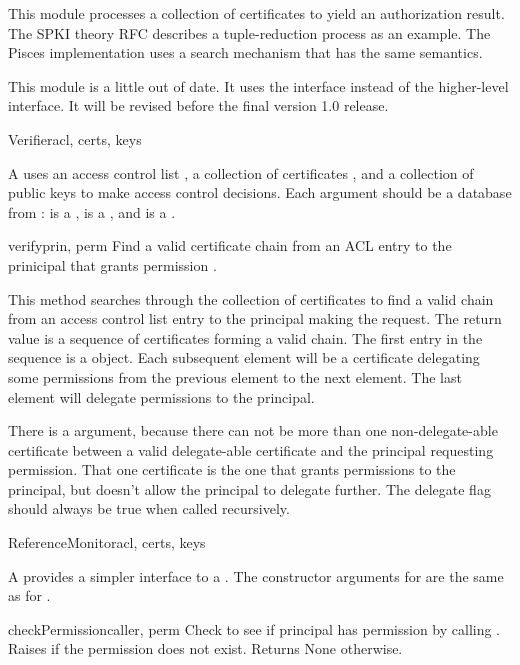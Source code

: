 \documentclass{howto}
\begin{document}
This module processes a collection of certificates to yield an
authorization result.  The SPKI theory RFC \cite{ellison99-theory}
describes a tuple-reduction process as an example.  The Pisces
implementation uses a search mechanism that has the same semantics.

This module is a little out of date.  It uses the
 interface instead of the higher-level
 interface.  It will be revised before
the final version 1.0 release.

\begin{classdesc}{Verifier}{acl, certs, keys}

A  uses an access control list , a collection
of certificates , and a collection of public keys 
to make access control decisions.  Each argument should be a database
from :  is a ,
 is a , and  is a 
.

\begin{methoddesc}{verify}{prin, perm}
Find a valid certificate chain from an ACL entry to the prinicipal
 that grants permission .

This method searches through the collection of certificates to find a
valid chain from an access control list entry to the principal making
the request.  The return value is a sequence of certificates forming a
valid chain.  The first entry in the sequence is a 
 object.  Each subsequent element
will be a certificate delegating some permissions from the previous
element to the next element.  The last element will delegate
permissions to the principal.

There is a  argument, because there can not be more than
one non-delegate-able certificate between a valid delegate-able
certificate and the principal requesting permission.  That one
certificate is the one that grants permissions to the principal, but
doesn't allow the principal to delegate further.  The delegate flag
should always be true when called recursively.
\end{methoddesc}

\end{classdesc}

\begin{classdesc}{ReferenceMonitor}{acl, certs, keys}

A  provides a simpler interface to a
.  The constructor arguments for
 are the same as for .

\begin{methoddesc}{checkPermission}{caller, perm}
Check to see if principal  has permission  by
calling .  Raises  if
the permission does not exist.  Returns None otherwise.
\end{methoddesc}

\end{classdesc}
\end{document}

